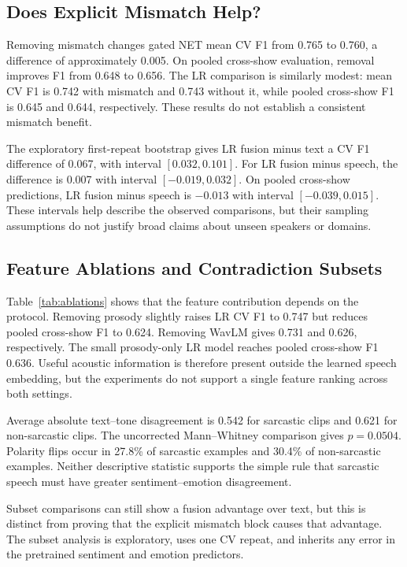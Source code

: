 \documentclass[conference]{IEEEtran}
\begin{document}
\subsection{Does Explicit Mismatch Help?}
Removing mismatch changes gated NET mean CV F1 from 0.765 to 0.760, a difference of approximately 0.005. On pooled cross-show evaluation, removal improves F1 from 0.648 to 0.656. The LR comparison is similarly modest: mean CV F1 is 0.742 with mismatch and 0.743 without it, while pooled cross-show F1 is 0.645 and 0.644, respectively. These results do not establish a consistent mismatch benefit.

The exploratory first-repeat bootstrap gives LR fusion minus text a CV F1 difference of 0.067, with interval $[0.032,0.101]$. For LR fusion minus speech, the difference is 0.007 with interval $[-0.019,0.032]$. On pooled cross-show predictions, LR fusion minus speech is $-0.013$ with interval $[-0.039,0.015]$. These intervals help describe the observed comparisons, but their sampling assumptions do not justify broad claims about unseen speakers or domains.


\subsection{Feature Ablations and Contradiction Subsets}
Table~\ref{tab:ablations} shows that the feature contribution depends on the protocol. Removing prosody slightly raises LR CV F1 to 0.747 but reduces pooled cross-show F1 to 0.624. Removing WavLM gives 0.731 and 0.626, respectively. The small prosody-only LR model reaches pooled cross-show F1 0.636. Useful acoustic information is therefore present outside the learned speech embedding, but the experiments do not support a single feature ranking across both settings.

Average absolute text--tone disagreement is 0.542 for sarcastic clips and 0.621 for non-sarcastic clips. The uncorrected Mann--Whitney comparison gives $p=0.0504$. Polarity flips occur in 27.8\% of sarcastic examples and 30.4\% of non-sarcastic examples. Neither descriptive statistic supports the simple rule that sarcastic speech must have greater sentiment--emotion disagreement.

Subset comparisons can still show a fusion advantage over text, but this is distinct from proving that the explicit mismatch block causes that advantage. The subset analysis is exploratory, uses one CV repeat, and inherits any error in the pretrained sentiment and emotion predictors.
\end{document}
